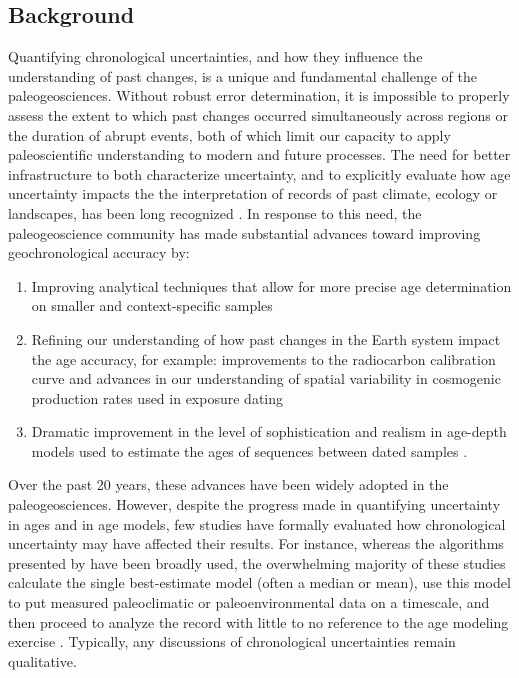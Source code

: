 \documentclass[gc, manuscript]{copernicus}
\begin{document}


\introduction

\subsection{Background}

Quantifying chronological uncertainties, and how they influence the understanding of past changes, is a unique and fundamental challenge of the paleogeosciences.
Without robust error determination, it is impossible to properly assess the extent to which past changes occurred simultaneously across regions or the duration of abrupt events, both of which limit our capacity to apply paleoscientific understanding to modern and future processes.
The need for better infrastructure to both characterize uncertainty, and to explicitly evaluate how age uncertainty impacts the the interpretation of records of past climate, ecology or landscapes, has been long recognized \citep[(more)]{Noren2013}.
In response to this need, the paleogeoscience community has made substantial advances toward improving geochronological accuracy by:

\begin{enumerate}
\def\labelenumi{\arabic{enumi}.}
\item
  Improving analytical techniques that allow for more precise age determination on smaller and context-specific samples \citep[\citet{Eglinton96},\citet{Fifield2000},\citet{Eggins2005},\citet{Santos_blank_2010}]{Brown_radiocarbon89}
\item
  Refining our understanding of how past changes in the Earth system impact the age accuracy, for example: improvements to the radiocarbon calibration curve \citep[\citet{Stuiver98},intcal references]{Stuiver91} and advances in our understanding of spatial variability in cosmogenic production rates used in exposure dating \citep[\citet{Masarik2009}]{Balco2009}
\item
  Dramatic improvement in the level of sophistication and realism in age-depth models used to estimate the ages of sequences between dated samples \citep[e.g.][\citet{parnell2008flexible}, \citet{Blaauw2010CLAM}, \citet{Blaauw2011BACON}]{Ramsey2009Bayesian}.
\end{enumerate}

Over the past 20 years, these advances have been widely adopted in the paleogeosciences.
However, despite the progress made in quantifying uncertainty in ages and in age models, few studies have formally evaluated how chronological uncertainty may have affected their results.
For instance, whereas the algorithms presented by \citep[\citet{parnell2008flexible}, \citet{Blaauw2010CLAM}, \citet{Blaauw2011BACON}]{Ramsey2009Bayesian} have been broadly used, the overwhelming majority of these studies calculate the single best-estimate model (often a median or mean), use this model to put measured paleoclimatic or paleoenvironmental data on a timescale, and then proceed to analyze the record with little to no reference to the age modeling exercise \citep[\citet{McKay2009}]{McKay2008}.
Typically, any discussions of chronological uncertainties remain qualitative.
\end{document}
